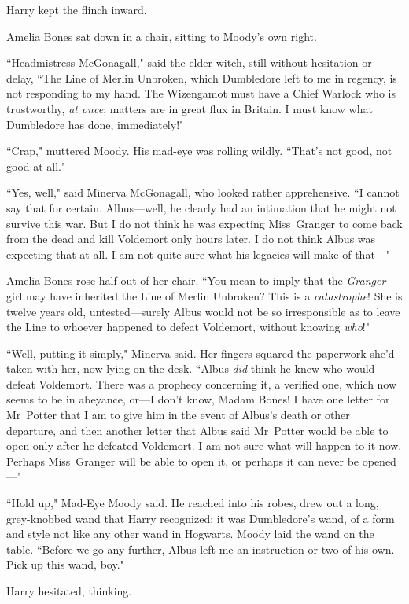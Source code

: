 Harry kept the flinch inward.

Amelia Bones sat down in a chair, sitting to Moody's own right.

``Headmistress McGonagall," said the elder witch, still without hesitation or delay, ``The Line of Merlin Unbroken, which Dumbledore left to me in regency, is not responding to my hand. The Wizengamot must have a Chief Warlock who is trustworthy, \emph{at once}; matters are in great flux in Britain. I must know what Dumbledore has done, immediately!"

``Crap," muttered Moody. His mad-eye was rolling wildly. ``That's not good, not good at all."

``Yes, well," said Minerva McGonagall, who looked rather apprehensive. ``I cannot say that for certain. Albus—well, he clearly had an intimation that he might not survive this war. But I do not think he was expecting Miss~Granger to come back from the dead and kill Voldemort only hours later. I do not think Albus was expecting that at all. I am not quite sure what his legacies will make of that—"

Amelia Bones rose half out of her chair. ``You mean to imply that the \emph{Granger} girl may have inherited the Line of Merlin Unbroken? This is a \emph{catastrophe}! She is twelve years old, untested—surely Albus would not be so irresponsible as to leave the Line to whoever happened to defeat Voldemort, without knowing \emph{who}!"

``Well, putting it simply," Minerva said. Her fingers squared the paperwork she'd taken with her, now lying on the desk. ``Albus \emph{did} think he knew who would defeat Voldemort. There was a prophecy concerning it, a verified one, which now seems to be in abeyance, or—I don't know, Madam Bones! I have one letter for Mr~Potter that I am to give him in the event of Albus's death or other departure, and then another letter that Albus said Mr~Potter would be able to open only after he defeated Voldemort. I am not sure what will happen to it now. Perhaps Miss~Granger will be able to open it, or perhaps it can never be opened—"

``Hold up," Mad-Eye Moody said. He reached into his robes, drew out a long, grey-knobbed wand that Harry recognized; it was Dumbledore's wand, of a form and style not like any other wand in Hogwarts. Moody laid the wand on the table. ``Before we go any further, Albus left me an instruction or two of his own. Pick up this wand, boy."

Harry hesitated, thinking.

